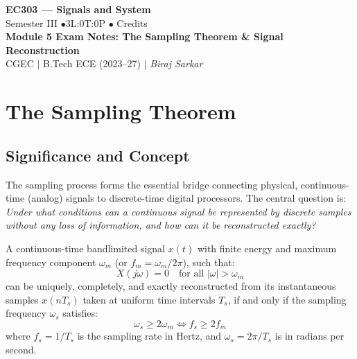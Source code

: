 \documentclass[12pt,a4paper]{article}
\begin{document}
\begin{center}
  {\LARGE\bfseries\color{myred} EC303 --- Signals and System}\\[5pt]
  {\normalsize\color{mydark} Semester III \quad$\bullet$\quad 3L:0T:0P \quad$\bullet$ Credits}\\[3pt]
  {\normalsize\color{myteal}\textbf{Module 5 Exam Notes: The Sampling Theorem \& Signal Reconstruction}}\\[3pt]
  {\small\color{mydark} CGEC \;$|$\; B.Tech ECE (2023--27) \;$|$\; \textit{Biraj Sarkar}}
\end{center}
\vspace{2pt}
\noindent{\color{myred}\rule{\linewidth}{1.5pt}}
\vspace{2pt}

\hypersetup{linkcolor=mydark}
\tableofcontents
\hypersetup{linkcolor=myteal}
\newpage

\section{The Sampling Theorem}

\subsection{Significance and Concept}
The sampling process forms the essential bridge connecting physical, continuous-time (analog) signals to discrete-time digital processors. The central question is: \textit{Under what conditions can a continuous signal be represented by discrete samples without any loss of information, and how can it be reconstructed exactly?}

\begin{tcolorbox}[defbox, title={\textbf{Nyquist-Shannon Sampling Theorem}}]
A continuous-time bandlimited signal $x(t)$ with finite energy and maximum frequency component $\omega_m$ (or $f_m = \omega_m / 2\pi$), such that:
\begin{equation}
  X(j\omega) = 0 \quad \text{for all } |\omega| > \omega_m
\end{equation}
can be uniquely, completely, and exactly reconstructed from its instantaneous samples $x(n T_s)$ taken at uniform time intervals $T_s$, if and only if the sampling frequency $\omega_s$ satisfies:
\begin{equation}
  \omega_s \ge 2 \omega_m \iff f_s \ge 2 f_m
\end{equation}
where $f_s = 1/T_s$ is the sampling rate in Hertz, and $\omega_s = 2\pi / T_s$ is in radians per second.
\end{tcolorbox}
\end{document}
